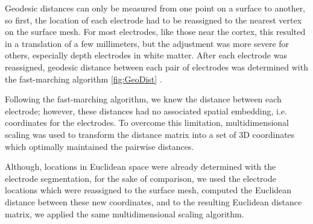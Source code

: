 Geodesic distances can only be measured from one point on a surface to another, so first, the location of each electrode had to be reassigned to the nearest vertex on the surface mesh. For most electrodes, like those near the cortex, this resulted in a translation of a few millimeters, but the adjustment was more severe for others, especially depth electrodes in white matter. After each electrode was reassigned, geodesic distance between each pair of electrodes was determined with the fast-marching algorithm \ref{fig:GeoDist} \citep{gptoolbox}.

Following the fast-marching algorithm, we knew the distance between each electrode; however, these distances had no associated spatial embedding, i.e. coordinates for the electrodes. To overcome this limitation, multidimensional scaling was used to transform the distance matrix into a set of 3D coordinates which optimally maintained the pairwise distances.

Although, locations in Euclidean space were already determined with the electrode segmentation, for the sake of comparison, we used the electrode locations which were reassigned to the surface mesh, computed the Euclidean distance between these new coordinates, and to the resulting Euclidean distance matrix, we applied the same multidimensional scaling algorithm. 

